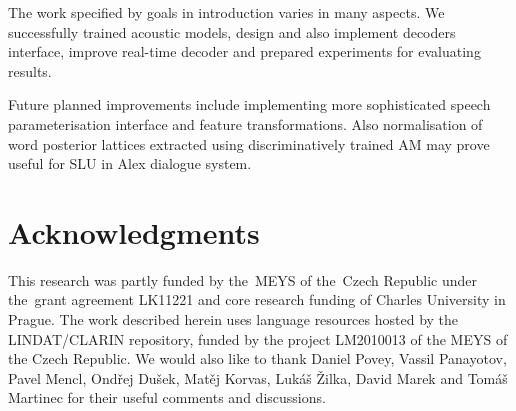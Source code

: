 % 
% 
% 

The work specified by goals in introduction varies in many aspects. 
We successfully trained acoustic models, design and also implement decoders interface, improve real-time decoder and prepared experiments for evaluating results.

Future planned improvements include implementing more sophisticated speech parameterisation interface and feature transformations. Also normalisation of word posterior lattices extracted using discriminatively trained \ac{AM} may prove useful for \acl{SLU} in Alex dialogue system.

\section*{Acknowledgments}
This research was partly funded by the~MEYS of the~Czech Republic under the~grant agreement LK11221 and core research funding of Charles University in Prague.
The work described herein uses language resources hosted by the LINDAT/CLARIN repository, funded by the project LM2010013 of the MEYS of the Czech Republic.
We would also like to thank Daniel Povey, Vassil Panayotov, Pavel Mencl, Ondřej Dušek, Matěj Korvas, Lukáš Žilka, David Marek and Tomáš Martinec for their useful comments and discussions.
